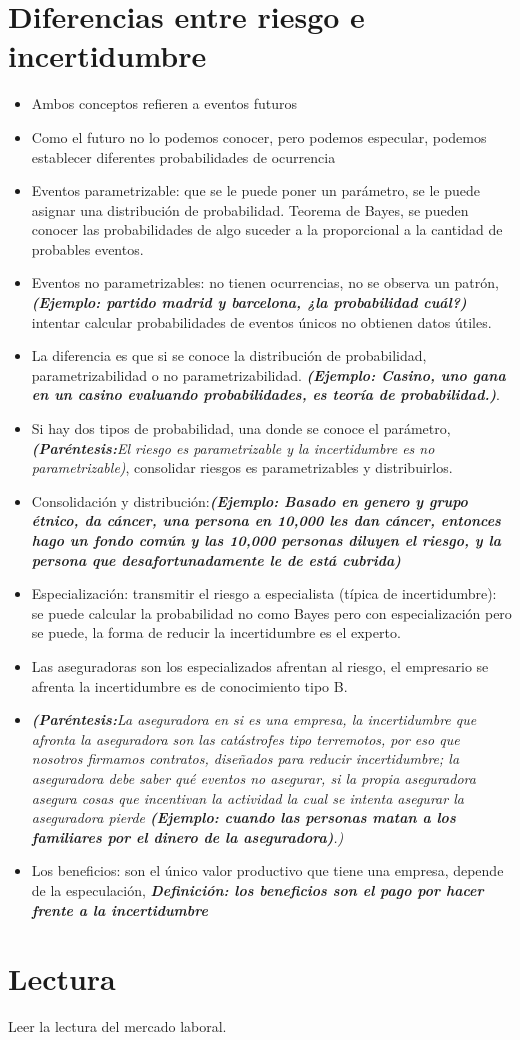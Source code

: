 \section{Diferencias entre riesgo e incertidumbre}
\begin{itemize}
    \item Ambos conceptos refieren a eventos futuros
    \item Como el futuro no lo podemos conocer, pero podemos especular, podemos establecer diferentes probabilidades de ocurrencia
    \item Eventos parametrizable: que se le puede poner un parámetro, se le puede asignar una distribución de probabilidad. Teorema de Bayes, se pueden conocer las probabilidades de algo suceder a la proporcional a la cantidad de probables eventos.
    \item Eventos no parametrizables: no tienen ocurrencias, no se observa un patrón, \textbf{\emph{(Ejemplo: partido madrid y barcelona, ¿la probabilidad cuál?)}} intentar calcular probabilidades de eventos únicos no obtienen datos útiles.
    \item La diferencia es que si se conoce la distribución de probabilidad, parametrizabilidad o no parametrizabilidad. \textbf{\emph{(Ejemplo: Casino, uno gana en un casino evaluando probabilidades, es teoría de probabilidad.)}}.
    \item Si hay dos tipos de probabilidad, una donde se conoce el parámetro, \emph{\textbf{(Paréntesis:}El riesgo es parametrizable y la incertidumbre es no parametrizable)}, consolidar riesgos es parametrizables y distribuirlos.
    \item Consolidación y distribución:\textbf{\emph{(Ejemplo: Basado en genero y grupo étnico, da cáncer, una persona en 10,000 les dan cáncer, entonces hago un fondo común y las 10,000 personas diluyen el riesgo, y la persona que desafortunadamente le de está cubrida)}}
    \item Especialización: transmitir el riesgo a especialista (típica de incertidumbre): se puede calcular la probabilidad no como Bayes pero con especialización pero se puede, la forma de reducir la incertidumbre es el experto.
    \item Las aseguradoras son los especializados afrentan al riesgo, el empresario se afrenta la incertidumbre es de conocimiento tipo B.
    \item \emph{\textbf{(Paréntesis:}La aseguradora en si es una empresa, la incertidumbre que afronta la aseguradora son las catástrofes tipo terremotos, por eso que nosotros firmamos contratos, diseñados para reducir incertidumbre; la aseguradora debe saber qué eventos no asegurar, si la propia aseguradora asegura cosas que incentivan la actividad la cual se intenta asegurar la aseguradora pierde \textbf{\emph{(Ejemplo: cuando las personas matan a los familiares por el dinero de la aseguradora)}}.)}
    \item Los beneficios: son el único valor productivo que tiene una empresa, depende de la especulación, \textbf{\emph{Definición: los beneficios son el pago por hacer frente a la incertidumbre}}
\end{itemize}

\section{Lectura}
Leer la lectura del mercado laboral.
